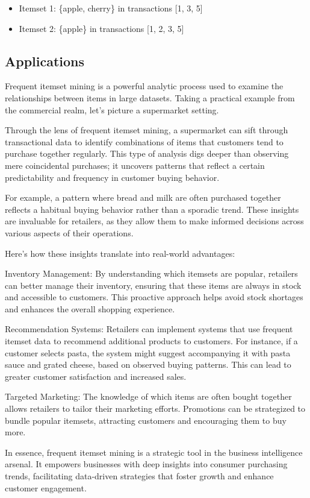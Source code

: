 \begin{itemize}
    \item Itemset 1: \{apple, cherry\} in transactions [1, 3, 5]
    \item Itemset 2: \{apple\} in transactions [1, 2, 3, 5]

\end{itemize}

\subsection{Applications}
Frequent itemset mining is a powerful analytic process used to examine the relationships between items in large datasets. Taking a practical example from the commercial realm, let's picture a supermarket setting.

Through the lens of frequent itemset mining, a supermarket can sift through transactional data to identify combinations of items that customers tend to purchase together regularly. This type of analysis digs deeper than observing mere coincidental purchases; it uncovers patterns that reflect a certain predictability and frequency in customer buying behavior.

For example, a pattern where bread and milk are often purchased together reflects a habitual buying behavior rather than a sporadic trend. These insights are invaluable for retailers, as they allow them to make informed decisions across various aspects of their operations.

Here's how these insights translate into real-world advantages:

Inventory Management: By understanding which itemsets are popular, retailers can better manage their inventory, ensuring that these items are always in stock and accessible to customers. This proactive approach helps avoid stock shortages and enhances the overall shopping experience.

Recommendation Systems: Retailers can implement systems that use frequent itemset data to recommend additional products to customers. For instance, if a customer selects pasta, the system might suggest accompanying it with pasta sauce and grated cheese, based on observed buying patterns. This can lead to greater customer satisfaction and increased sales.

Targeted Marketing: The knowledge of which items are often bought together allows retailers to tailor their marketing efforts. Promotions can be strategized to bundle popular itemsets, attracting customers and encouraging them to buy more.

In essence, frequent itemset mining is a strategic tool in the business intelligence arsenal. It empowers businesses with deep insights into consumer purchasing trends, facilitating data-driven strategies that foster growth and enhance customer engagement.
